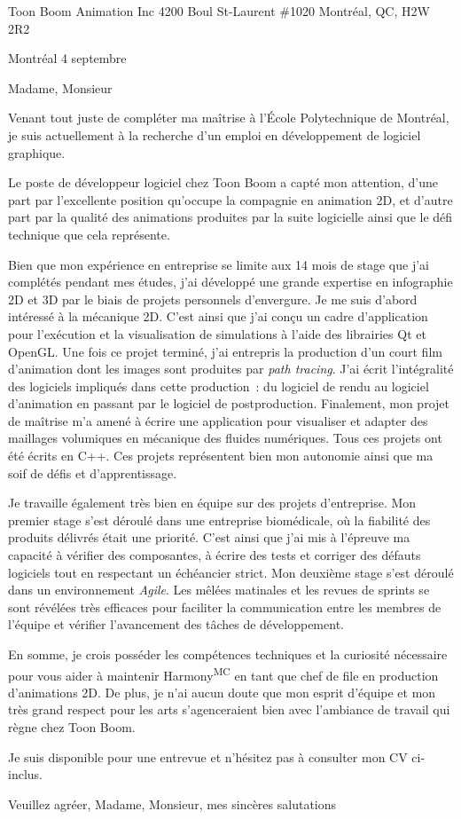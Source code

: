 \insertcvheader

\clurecipient
 {Toon Boom Animation Inc}
 {4200 Boul St-Laurent \#1020}
 {Montréal, QC, H2W 2R2}
 
\cllocationdate
 {Montréal}
 {4 septembre}
 
\clgreeting
 {Madame, Monsieur}
 
Venant tout juste de compléter ma maîtrise à l’École Polytechnique de Montréal, je suis actuellement à la recherche d’un emploi en développement de logiciel graphique.

Le poste de développeur logiciel chez Toon Boom a capté mon attention, d’une part par l’excellente position qu’occupe la compagnie en animation 2D, et d’autre part par la qualité des animations produites par la suite logicielle ainsi que le défi technique que cela représente.
 
Bien que mon expérience en entreprise se limite aux 14 mois de stage que j’ai complétés pendant mes études, j’ai développé une grande expertise en infographie 2D et 3D par le biais de projets personnels d’envergure. Je me suis d’abord intéressé à la mécanique 2D. C’est ainsi que j’ai conçu un cadre d’application pour l’exécution et la visualisation de simulations à l’aide des librairies Qt et OpenGL. Une fois ce projet terminé, j’ai entrepris la production d’un court film d’animation dont les images sont produites par \textit{path tracing}. J’ai écrit l’intégralité des logiciels impliqués dans cette production~: du logiciel de rendu au logiciel d’animation en passant par le logiciel de postproduction. Finalement, mon projet de maîtrise m’a amené à écrire une application pour visualiser et adapter des maillages volumiques en mécanique des fluides numériques. Tous ces projets ont été écrits en C++. Ces projets représentent bien mon autonomie ainsi que ma soif de défis et d’apprentissage.

Je travaille également très bien en équipe sur des projets d’entreprise. Mon premier stage s’est déroulé dans une entreprise biomédicale, où la fiabilité des produits délivrés était une priorité. C’est ainsi que j’ai mis à l’épreuve ma capacité à vérifier des composantes, à écrire des tests et corriger des défauts logiciels tout en respectant un échéancier strict. Mon deuxième stage s’est déroulé dans un environnement \textit{Agile}. Les mêlées matinales et les revues de sprints se sont révélées très efficaces pour faciliter la communication entre les membres de l’équipe et vérifier l’avancement des tâches de développement.

En somme, je crois posséder les compétences techniques et la curiosité nécessaire pour vous aider à maintenir Harmony\textsuperscript{MC} en tant que chef de file en production d’animations 2D. De plus, je n’ai aucun doute que mon esprit d’équipe et mon très grand respect pour les arts s’agenceraient bien avec l’ambiance de travail qui règne chez Toon Boom. 

Je suis disponible pour une entrevue et n’hésitez pas à consulter mon CV ci-inclus.

Veuillez agréer, Madame, Monsieur, mes sincères salutations

